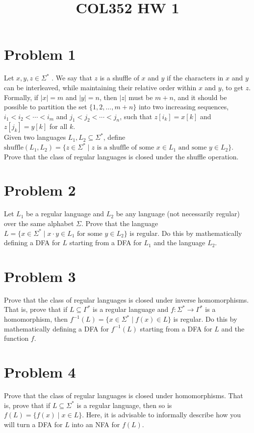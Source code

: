 \documentclass[a4paper]{article}
\title{\textbf{COL352 HW 1}}
\date{}
\begin{document}
\maketitle
\tableofcontents

\section{Problem 1}

Let $x, y, z \in \Sigma^*$ . We say that $z$ is a shuffle of $x$ and $y$ if the characters in $x$ and $y$ can be interleaved, while maintaining their relative order within $x$ and $y$, to get $z$.
Formally, if $|x| = m$ and $|y| = n$, then $|z|$ must be $m + n$, and it should be possible to partition the set $\{1, 2, \ldots, m + n\}$ into two increasing sequences, $i_1 < i_2 < \cdots < i_m$ and
$j_1 < j_2 < \cdots < j_n$, such that $z[i_k] = x[k]$ and $z[j_k] = y[k]$ for all $k$.\\

Given two languages $L_1, L_2 \subseteq \Sigma^*$, define $\mathrm{shuffle}(L_1, L_2) = \{z \in \Sigma^* \mid z \text{ is a shuffle of some } x \in L_1 \text{ and some } y \in L_2\}$.
Prove that the class of regular languages is closed under the shuffle operation.

\section{Problem 2}
Let $L_1$ be a regular language and $L_2$ be any language (not necessarily regular) over the same alphabet $\Sigma$.
Prove that the language $L = \{x \in \Sigma^* \mid x \cdot y \in L_1 \text{ for some } y \in L_2\}$ is regular. Do this by mathematically
defining a DFA for $L$ starting from a DFA for $L_1$ and the language $L_2$.

\section{Problem 3}
Prove that the class of regular languages is closed under inverse homomorphisms. That is, prove that if
$L \subseteq \Gamma^*$ is a regular language and $f : \Sigma^* \to \Gamma^*$ is a homomorphism, then $f^{-1}(L) = \{x \in \Sigma^* \mid f(x) \in L\}$
is regular. Do this by mathematically defining a DFA for $f^{-1}(L)$ starting from a DFA for $L$ and the
function $f$.

\section{Problem 4}
Prove that the class of regular languages is closed under homomorphisms. That is, prove that if $L \subseteq \Sigma^*$
is a regular language, then so is $f(L) = \{f(x) \mid x \in L\}$. Here, it is advisable to informally describe how
you will turn a DFA for $L$ into an NFA for $f(L)$.
\end{document}

